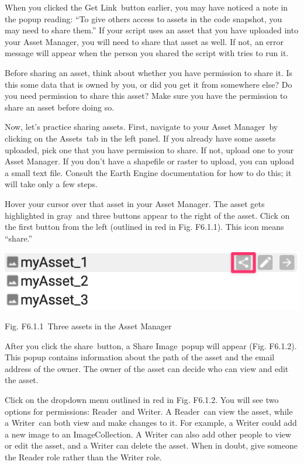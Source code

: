 \documentclass[
  letterpaper,
  DIV=11,
  numbers=noendperiod]{scrreprt}
\begin{document}
When you clicked the Get Link~button earlier, you may have noticed a
note in the popup reading: ``To give others access to assets in the code
snapshot, you may need to share them.'' If your script uses an asset
that you have uploaded into your Asset Manager, you will need to share
that asset as well. If not, an error message will appear when the person
you shared the script with tries to run it.

Before sharing an asset, think about whether you have permission to
share it. Is this some data that is owned by you, or did you get it from
somewhere else? Do you need permission to share this asset? Make sure
you have the permission to share an asset before doing so.

Now, let's practice sharing assets. First, navigate to your Asset
Manager~by clicking on the Assets~tab in the left panel. If you already
have some assets uploaded, pick one that you have permission to share.
If not, upload one to your Asset Manager. If you don't have a shapefile
or raster to upload, you can upload a small text file. Consult the Earth
Engine documentation for how to do this; it will take only a few steps.

Hover your cursor over that asset in your Asset Manager. The asset gets
highlighted in gray~and three buttons appear to the right of the asset.
Click on the first button from the left (outlined in red in Fig.
F6.1.1). This icon means ``share.''

\includegraphics{./F6/image26.png}

Fig. F6.1.1~Three assets in the Asset Manager

After you click the share~button, a Share Image~popup will appear (Fig.
F6.1.2). This popup contains information about the path of the asset and
the email address of the owner. The owner of the asset can decide who
can view and edit the asset.

Click on the dropdown menu outlined in red in Fig. F6.1.2. You will see
two options for permissions: Reader~and Writer. A Reader~can view the
asset, while a Writer~can both view and make changes to it. For example,
a Writer could add a new image to an ImageCollection. A Writer can also
add other people to view or edit the asset, and a Writer can delete the
asset. When in doubt, give someone the Reader role rather than the
Writer role.
\end{document}
